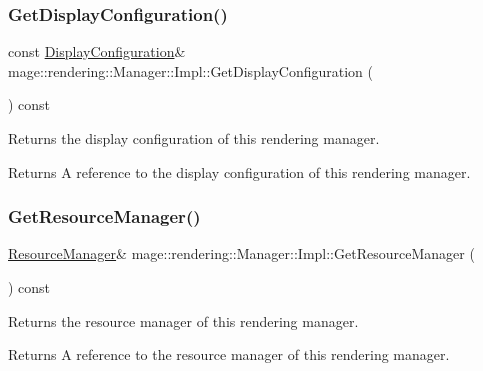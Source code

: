 \subsubsection{\texorpdfstring{Get\+Display\+Configuration()}{GetDisplayConfiguration()}}
{\footnotesize\ttfamily const \hyperlink{classmage_1_1rendering_1_1_display_configuration}{Display\+Configuration}\& mage\+::rendering\+::\+Manager\+::\+Impl\+::\+Get\+Display\+Configuration (\begin{DoxyParamCaption}{ }\end{DoxyParamCaption}) const\hspace{0.3cm}{\ttfamily [noexcept]}}

Returns the display configuration of this rendering manager.

\begin{DoxyReturn}{Returns}
A reference to the display configuration of this rendering manager. 
\end{DoxyReturn}
\hypertarget{classmage_1_1rendering_1_1_manager_1_1_impl_a604da1cb1bf3eb9783320ee1366c43a4}{}\label{classmage_1_1rendering_1_1_manager_1_1_impl_a604da1cb1bf3eb9783320ee1366c43a4} 
\subsubsection{\texorpdfstring{Get\+Resource\+Manager()}{GetResourceManager()}}
{\footnotesize\ttfamily \hyperlink{classmage_1_1rendering_1_1_resource_manager}{Resource\+Manager}\& mage\+::rendering\+::\+Manager\+::\+Impl\+::\+Get\+Resource\+Manager (\begin{DoxyParamCaption}{ }\end{DoxyParamCaption}) const\hspace{0.3cm}{\ttfamily [noexcept]}}

Returns the resource manager of this rendering manager.

\begin{DoxyReturn}{Returns}
A reference to the resource manager of this rendering manager. 
\end{DoxyReturn}
\hypertarget{classmage_1_1rendering_1_1_manager_1_1_impl_aa2f6c98780d9e035ae1eb3822e5e3810}{}\label{classmage_1_1rendering_1_1_manager_1_1_impl_aa2f6c98780d9e035ae1eb3822e5e3810} 
